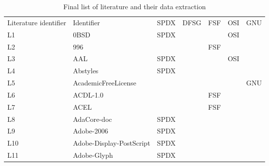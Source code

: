 
\begin{longtable}[h]{m{2cm} | m{7cm} | c | c | c | c | c}
  \caption{Final list of literature and their data extraction} \label{table:appendix:c} \\
  \hline
  Literature identifier & Identifier & SPDX & DFSG & FSF & OSI & GNU \\
  L1 & 0BSD & SPDX &  &  & OSI &  \\
  L2 & 996 &  &  & FSF &  &  \\
  L3 & AAL & SPDX &  &  & OSI &  \\
  L4 & Abstyles & SPDX &  &  &  &  \\
  L5 & AcademicFreeLicense &  &  &  &  & GNU \\
  L6 & ACDL-1.0 &  &  & FSF &  &  \\
  L7 & ACEL &  &  & FSF &  &  \\
  L8 & AdaCore-doc & SPDX &  &  &  &  \\
  L9 & Adobe-2006 & SPDX &  &  &  &  \\
  L10 & Adobe-Display-PostScript & SPDX &  &  &  &  \\
  L11 & Adobe-Glyph & SPDX &  &  &  &  \\
\end{longtable}